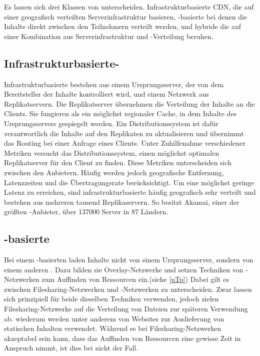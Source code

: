 Es lassen sich drei Klassen von \cdns unterscheiden. Infrastrukturbasierte CDN, die auf einer geografisch verteilten Serverinfrastruktur basieren, \pTp-basierte \cdns bei denen die Inhalte direkt zwischen den Teilnehmern verteilt werden, und hybride \cdns die auf einer Kombination aus Serverinfrastruktur und \pTp-Verteilung beruhen.

\subsection{Infrastrukturbasierte-\cdns}
Infrastrukturbasierte \cdns bestehen aus einem Ursprungsserver, der von dem Bereitsteller der Inhalte kontrolliert wird, und einem Netzwerk aus Replikatservern. Die Replikatserver übernehmen die Verteilung der Inhalte an die Clients. Sie fungieren als ein möglichst regionaler Cache, in dem Inhalte des Ursprungsservers gespiegelt werden. Ein Distributionssystem ist dafür verantwortlich die Inhalte auf den Replikaten zu aktualisieren und übernimmt das Routing bei einer Anfrage eines Clients. Unter Zuhilfenahme verschiedener Metriken versucht das Distributionssystem, einen möglichst optimalen Replikatserver für den Client zu finden. Diese Metriken unterscheiden sich zwischen den Anbietern. Häufig werden jedoch geografische Entfernung, Latenzzeiten und die Übertragungsrate berücksichtigt. Um eine möglichst geringe Latenz zu erreichen, sind infrastrukturbasierte \cdns häufig geografisch sehr verteilt und bestehen aus mehreren tausend Replikaservern. So besitzt Akamai, einer der größten \cdn-Anbieter, über 137000 Server in 87 Ländern. \cite{akamaiPeer} 


\subsection{\pTp-basierte \cdns }

Bei einem \pTp-basierten \cdn laden \clients Inhalte nicht von einem Ursprungsserver, sondern von einem anderen \client. Dazu bilden sie Overlay-Netzwerke und setzen Techniken von \pTp-Netzwerken zum Auffinden von Ressourcen ein.(siehe \ref{pTp}) Dabei gilt es zwischen Filesharing-Netzwerken und \cdn-Netzwerken zu unterscheiden. Zwar lassen sich prinzipiell für beide dieselben Techniken verwenden, jedoch zielen Filesharing-Netzwerke auf die Verteilung von Dateien zur späteren Verwendung ab. \cdns wiederum werden unter anderem von Websites zur Auslieferung von statischen Inhalten verwendet. Während es bei Filesharing-Netzwerken akzeptabel sein kann, dass das Auffinden von Ressourcen eine gewisse Zeit in Anspruch nimmt, ist dies bei \cdns nicht der Fall.

